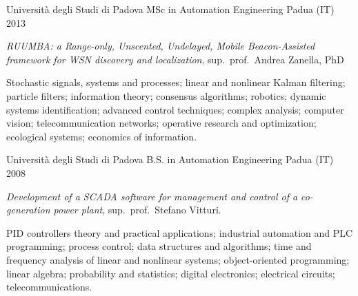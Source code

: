 
\begin{cventries}

	\cventry%
		{Università degli Studi di Padova}
		{MSc in Automation Engineering}
		{Padua (IT)}
		{2013}
		{\begin{cvitems}
			\item {\emph{RUUMBA: a Range-only, Unscented, Undelayed, Mobile Beacon-Assisted framework for WSN discovery and localization}, sup.~prof.~Andrea Zanella, PhD}
			\item {Stochastic signals, systems and processes; linear and nonlinear Kalman filtering; particle filters; information theory; consensus algorithms; robotics; dynamic systems identification; advanced control techniques; complex analysis; computer vision; telecommunication networks; operative research and optimization; ecological systems; economics of information.}
		\end{cvitems}}

	\cventry%
		{Università degli Studi di Padova}
		{B.S. in Automation Engineering}
		{Padua (IT)}
		{2008}
		{\begin{cvitems}
			\item {\emph{Development of a SCADA software for management and control of a co-generation power plant}, sup.~prof.~Stefano Vitturi.}
			\item {PID controllers theory and practical applications; industrial automation and PLC programming; process control; data structures and algorithms; time and frequency analysis of linear and nonlinear systems; object-oriented programming; linear algebra; probability and statistics; digital electronics; electrical circuits; telecommunications.}
		\end{cvitems}}


\end{cventries}
